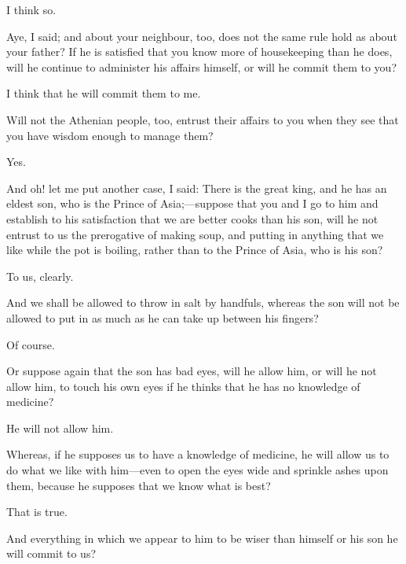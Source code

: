 \documentclass[11pt,letter]{article}
\begin{document}
\par  I think so.

\par  Aye, I said; and about your neighbour, too, does not the same rule hold as about your father? If he is satisfied that you know more of housekeeping than he does, will he continue to administer his affairs himself, or will he commit them to you?

\par  I think that he will commit them to me.

\par  Will not the Athenian people, too, entrust their affairs to you when they see that you have wisdom enough to manage them?

\par  Yes.

\par  And oh! let me put another case, I said: There is the great king, and he has an eldest son, who is the Prince of Asia;—suppose that you and I go to him and establish to his satisfaction that we are better cooks than his son, will he not entrust to us the prerogative of making soup, and putting in anything that we like while the pot is boiling, rather than to the Prince of Asia, who is his son?

\par  To us, clearly.

\par  And we shall be allowed to throw in salt by handfuls, whereas the son will not be allowed to put in as much as he can take up between his fingers?

\par  Of course.

\par  Or suppose again that the son has bad eyes, will he allow him, or will he not allow him, to touch his own eyes if he thinks that he has no knowledge of medicine?

\par  He will not allow him.

\par  Whereas, if he supposes us to have a knowledge of medicine, he will allow us to do what we like with him—even to open the eyes wide and sprinkle ashes upon them, because he supposes that we know what is best?

\par  That is true.

\par  And everything in which we appear to him to be wiser than himself or his son he will commit to us?
\end{document}
